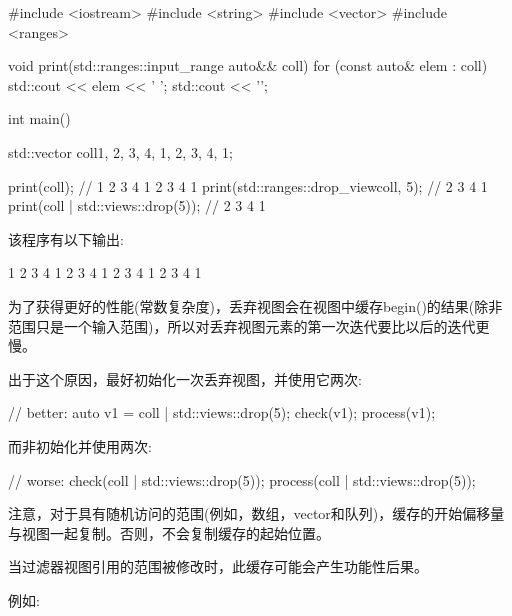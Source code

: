 
\begin{cpp}
#include <iostream>
#include <string>
#include <vector>
#include <ranges>

void print(std::ranges::input_range auto&& coll)
{
	for (const auto& elem : coll) {
		std::cout << elem << ' ';
	}
	std::cout << '\n';
}

int main()
{
	std::vector coll{1, 2, 3, 4, 1, 2, 3, 4, 1};
	
	print(coll); // 1 2 3 4 1 2 3 4 1
	print(std::ranges::drop_view{coll, 5}); // 2 3 4 1
	print(coll | std::views::drop(5)); // 2 3 4 1
}
\end{cpp}

该程序有以下输出:

\begin{shell}
1 2 3 4 1 2 3 4 1
2 3 4 1
2 3 4 1
\end{shell}


为了获得更好的性能(常数复杂度)，丢弃视图会在视图中缓存begin()的结果(除非范围只是一个输入范围)，所以对丢弃视图元素的第一次迭代要比以后的迭代更慢。

出于这个原因，最好初始化一次丢弃视图，并使用它两次:

\begin{cpp}
// better:
auto v1 = coll | std::views::drop(5);
check(v1);
process(v1);
\end{cpp}

而非初始化并使用两次:

\begin{cpp}
// worse:
check(coll | std::views::drop(5));
process(coll | std::views::drop(5));
\end{cpp}

注意，对于具有随机访问的范围(例如，数组，vector和队列)，缓存的开始偏移量与视图一起复制。否则，不会复制缓存的起始位置。

当过滤器视图引用的范围被修改时，此缓存可能会产生功能性后果。

例如:


